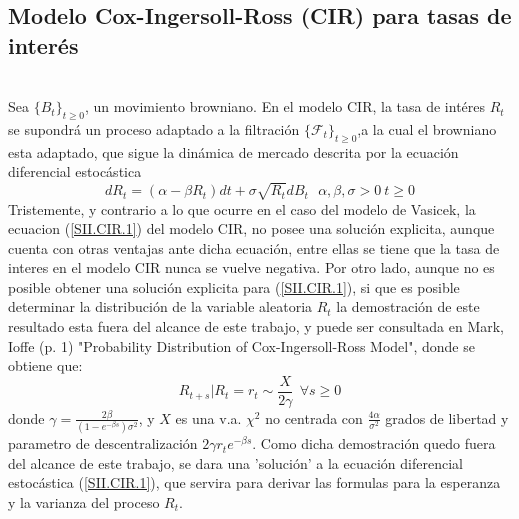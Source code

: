 \documentclass[11pt,notitlepage]{article}
\begin{document}
        \subsection{Modelo Cox-Ingersoll-Ross (CIR) para tasas de interés}\\
        Sea \(\{B_{t}\}_{t\geq0}\), un movimiento browniano. En el modelo CIR, la tasa de intéres \(R_t\) se supondrá un proceso adaptado a la filtración
        \(\{\mathcal{F}_{t}\}_{t\geq0}\),a la cual el browniano esta adaptado, que sigue la dinámica de mercado descrita por la ecuación diferencial estocástica 
        \begin{equation}\label{SII.CIR.1}
            dR_t = (\alpha - \beta R_t)dt + \sigma\sqrt{R_t}dB_t \ \ \ \alpha,\beta,\sigma >0 \ t \geq 0 
        \end{equation}        
        Tristemente, y contrario a lo que ocurre en el caso del modelo de Vasicek, la ecuacion (\ref{SII.CIR.1}) del modelo CIR, no posee una solución explicita, aunque cuenta con otras ventajas ante dicha ecuación, entre ellas se tiene que la tasa de interes en el modelo CIR nunca se vuelve negativa.
        Por otro lado, aunque no es posible obtener una solución explicita para (\ref{SII.CIR.1}), si que es posible determinar la distribución de la variable aleatoria
        \(R_t\) la demostración de este resultado esta fuera del alcance de este trabajo, y puede ser consultada en Mark, Ioffe (p. 1) "Probability Distribution of Cox-Ingersoll-Ross Model", donde se obtiene que: 
        \[
        R_{t + s} | R_t = r_t \sim \frac{X}{2\gamma} \ \ \forall s \geq 0 
        \]
        donde \(\gamma = \frac{2\beta}{(1 - e^{-\beta s})\sigma^2}\), y \(X\) es una v.a. \(\chi^2\) no centrada con \(\frac{4\alpha}{\sigma^2}\) grados de libertad
        y parametro de descentralización \(2\gamma r_t e^{-\beta s}\). 
        Como dicha demostración quedo fuera del alcance de este trabajo, se dara una 'solución' a la ecuación diferencial estocástica (\ref{SII.CIR.1}), que servira 
        para derivar las formulas para la esperanza y la varianza del proceso \(R_t\).
\end{document}
